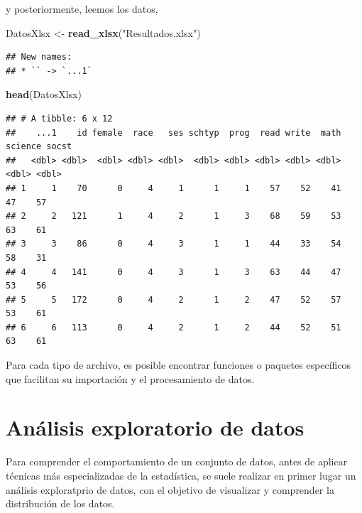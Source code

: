 \documentclass[
]{book}
\newenvironment{Shaded}{\begin{snugshade}}{\end{snugshade}}
\newcommand{\FunctionTok}[1]{\textcolor[rgb]{0.13,0.29,0.53}{\textbf{#1}}}
\newcommand{\NormalTok}[1]{#1}
\newcommand{\OtherTok}[1]{\textcolor[rgb]{0.56,0.35,0.01}{#1}}
\newcommand{\StringTok}[1]{\textcolor[rgb]{0.31,0.60,0.02}{#1}}
\begin{document}
y posteriormente, leemos los datos,

\begin{Shaded}
\begin{Highlighting}[]
\NormalTok{DatosXlsx }\OtherTok{\textless{}{-}} \FunctionTok{read\_xlsx}\NormalTok{(}\StringTok{"Resultados.xlsx"}\NormalTok{)}
\end{Highlighting}
\end{Shaded}

\begin{verbatim}
## New names:
## * `` -> `...1`
\end{verbatim}

\begin{Shaded}
\begin{Highlighting}[]
\FunctionTok{head}\NormalTok{(DatosXlsx)}
\end{Highlighting}
\end{Shaded}

\begin{verbatim}
## # A tibble: 6 x 12
##    ...1    id female  race   ses schtyp  prog  read write  math science socst
##   <dbl> <dbl>  <dbl> <dbl> <dbl>  <dbl> <dbl> <dbl> <dbl> <dbl>   <dbl> <dbl>
## 1     1    70      0     4     1      1     1    57    52    41      47    57
## 2     2   121      1     4     2      1     3    68    59    53      63    61
## 3     3    86      0     4     3      1     1    44    33    54      58    31
## 4     4   141      0     4     3      1     3    63    44    47      53    56
## 5     5   172      0     4     2      1     2    47    52    57      53    61
## 6     6   113      0     4     2      1     2    44    52    51      63    61
\end{verbatim}

Para cada tipo de archivo, es posible encontrar funciones o paquetes específicos que facilitan su importación y el procesamiento de datos.

\hypertarget{anuxe1lisis-exploratorio-de-datos}{%
\chapter{Análisis exploratorio de datos}\label{anuxe1lisis-exploratorio-de-datos}}

Para comprender el comportamiento de un conjunto de datos, antes de aplicar técnicas más especializadas de la estadística, se suele realizar en primer lugar un análisis exploratprio de datos, con el objetivo de visualizar y comprender la distribución de los datos.
\end{document}
